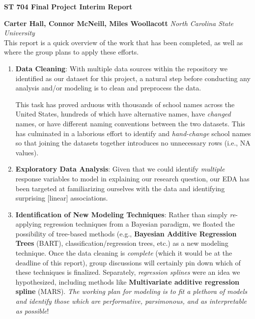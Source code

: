 \documentclass[a4paper,10pt]{article}
\begin{document}
\noindent 
\begin{center}
\textbf{{\Large ST 704 Final Project Interim Report}} \\
\end{center}

\noindent 
\textbf{Carter Hall, Connor McNeill, Miles Woollacott} \textit{North Carolina State University}
\\

\noindent
This report is a quick overview of the work that has been completed, as well as where the group plans to apply these efforts.
\begin{enumerate}
    \item \textbf{Data Cleaning}: With multiple data sources within the repository we identified as our dataset for this project, a natural step before conducting any analysis and/or modeling is to clean and preprocess the data. 

    This task has proved arduous with thousands of school names across the United States, hundreds of which have alternative names, have \textit{changed} names, or have different naming conventions between the two datasets. This has culminated in a laborious effort to identify and \textit{hand-change} school names so that joining the datasets together introduces no unnecessary rows (i.e., NA values).  
    \item \textbf{Exploratory Data Analysis}: Given that we could identify \textit{multiple} response variables to model in explaining our research question, our EDA has been targeted at familiarizing ourselves with the data and identifying surprising [linear] associations. 
    \item \textbf{Identification of New Modeling Techniques}: Rather than simply \textit{re}-applying regression techniques from a Bayesian paradigm, we floated the possibility of tree-based methods (e.g., \textbf{Bayesian Additive Regression Trees} (BART), classification/regression trees, etc.) as a new modeling technique. Once the data cleaning is \textit{complete} (which it would be at the deadline of this report), group discussions will certainly pin down which of these techniques is finalized. Separately, \textit{regression splines} were an idea we hypothesized, including methods like \textbf{Multivariate additive regression spline} (MARS). \textit{The working plan for modeling is to fit a plethora of models and identify those which are performative, parsimonous, and as interpretable as possible}! 
\end{enumerate}
\end{document}
